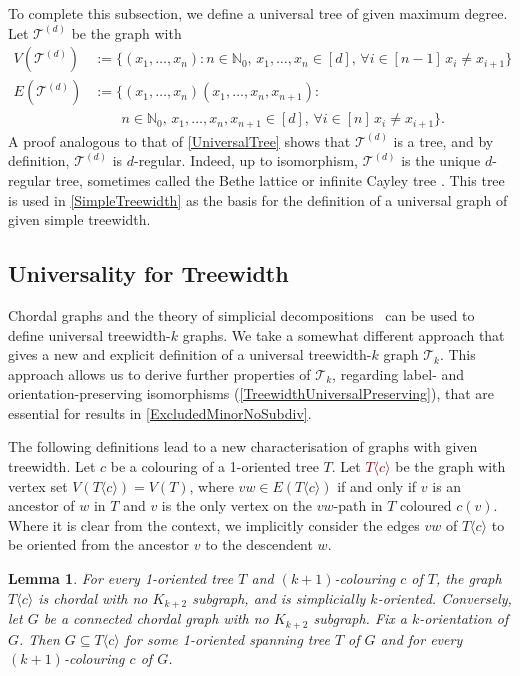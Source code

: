 \documentclass[a4paper,11pt]{article}
\newcommand{\defn}[1]{\textcolor{Maroon}{\emph{#1}}\index{#1}}
\theoremstyle{plain}
\newtheorem{lem}[thm]{Lemma}
\theoremstyle{definition}
\newcommand{\TT}{\mathcal{T}}
\newcommand{\NN}{\mathbb{N}}
\newcommand{\GGG}[2]{#1\langle{#2}\rangle}
\begin{document}
To complete this subsection, we define a universal tree of given maximum degree. Let $\TT^{(d)}$ be the graph with 
\begin{align*}
V(\TT^{(d)}) & := \{ (x_1,\dots,x_n): n\in\NN_0,\, x_1,\dots,x_n\in[d], \,
\forall i\in[n-1] \, x_i\neq x_{i+1} \}\\
E(\TT^{(d)}) & := \{ (x_1,\dots,x_n)(x_1,\dots,x_n,x_{n+1}):\\
& \qquad n\in\NN_0,\, x_1,\dots,x_n,x_{n+1}\in[d], \, \forall i\in[n]\, x_i\neq x_{i+1}\}.
\end{align*}
A proof analogous to that of \cref{UniversalTree} shows that $\TT^{(d)}$ is a tree, and by definition, $\TT^{(d)}$ is $d$-regular. Indeed, up to isomorphism, $\TT^{(d)}$ is the unique $d$-regular tree, sometimes called the Bethe lattice or infinite Cayley tree \citep{Bethe35,Ostilli12}. This tree is used in \cref{SimpleTreewidth} as the basis for the definition of a universal graph of given simple treewidth. 


\subsection{Universality for Treewidth}
\label{Treewidth}

Chordal graphs and the theory of simplicial decompositions~\citep{Thom83,Diestel90,Halin84,Halin82,Halin78} can be used to define universal treewidth-$k$ graphs. We take a somewhat different approach that gives a new and explicit definition of a universal treewidth-$k$ graph $\TT_k$. This approach allows us to derive further properties of $\TT_k$, regarding label- and orientation-preserving isomorphisms (\cref{TreewidthUniversalPreserving}), that are essential for results in \cref{ExcludedMinorNoSubdiv}. 

The following definitions lead to a new characterisation of graphs with given treewidth. Let $c$ be a colouring of a 1-oriented tree $T$. Let \defn{$\GGG{T}{c}$} be the graph with vertex set $V(\GGG{T}{c})=V(T)$, where $vw\in E(\GGG{T}{c})$ if and only if $v$ is an ancestor of $w$ in $T$ and $v$ is the only vertex on the $vw$-path in $T$ coloured $c(v)$. 
Where it is clear from the context, we implicitly consider the edges $vw$ of $\GGG{T}{c}$ to be oriented from the ancestor $v$ to the descendent $w$. 

\begin{lem}
\label{FindSpanningTree}
For every 1-oriented tree $T$ and $(k+1)$-colouring $c$ of $T$, the graph $\GGG{T}{c}$ is chordal with no $K_{k+2}$ subgraph, and is simplicially $k$-oriented. Conversely, let $G$ be a connected chordal graph with no $K_{k+2}$ subgraph. Fix a $k$-orientation of $G$. Then $G\subseteq \GGG{T}{c}$ for some 1-oriented spanning tree $T$ of $G$ and for every $(k+1)$-colouring $c$ of $G$.
\end{lem}
\end{document}
